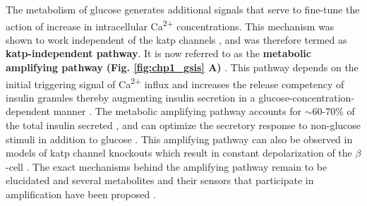 \par The metabolism of glucose generates additional signals that serve to fine-tune the action of increase in intracellular Ca\textsuperscript{2+} concentrations. This mechanism was shown to work independent of the \gls{katp} channels \textbf{\cite{sato_dual_1992,gembal_evidence_1992}}, and was therefore termed as \textbf{\gls{katp}-independent pathway}. It is now referred to as the \textbf{metabolic amplifying pathway} \textbf{(Fig. \ref{fig:chp1_gsis} A)} \textbf{\cite{henquin_triggering_2000,henquin_pathways_2004,henquin_regulation_2009}}.  This pathway depends on the initial triggering signal of Ca\textsuperscript{2+} influx and increases the release competency of insulin granules thereby augmenting insulin secretion in a glucose-concentration-dependent manner \textbf{\cite{henquin_triggering_2000,kalwat_mechanisms_2017}}. The metabolic amplifying pathway accounts for $\sim$60-70\% of the total insulin secreted \textbf{\cite{henquin_regulation_2009}}, and can optimize the secretory response to non-glucose stimuli in addition to glucose \textbf{\cite{henquin_triggering_2000,kalwat_mechanisms_2017,zhao_-hydrolase_2015,tengholm_camp_2017,han_glutamate_2021}}. This amplifying pathway can also be observed in models of \gls{katp} channel knockouts which result in constant depolarization of the $\beta$-cell \textbf{\cite{nenquin_both_2004,miki_defective_1998,ravier_glucose_2009}}. The exact mechanisms behind the amplifying pathway remain to be elucidated and several metabolites and their sensors that participate in amplification have been proposed \textbf{\cite{kalwat_mechanisms_2017}}.%
\\




